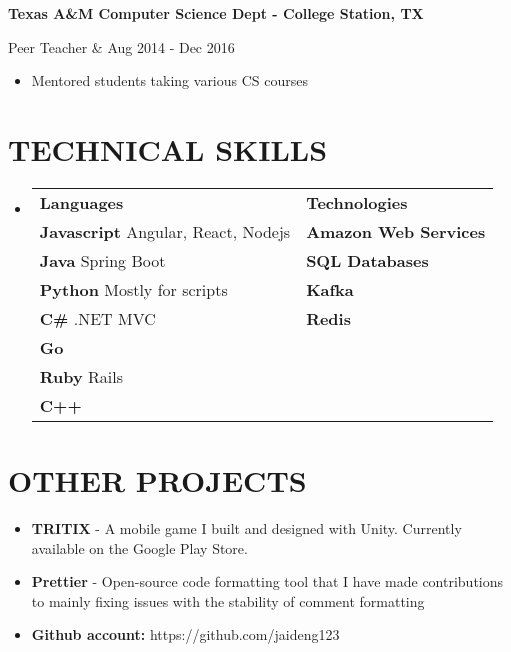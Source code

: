 \documentclass[margin,10pt]{res} %
\begin{document}
\begin{resume}
\begin{itemize}
                \end{itemize}
				{\bf Texas A\&M Computer Science Dept - College Station, TX} \\ 
                \begin{ncolumn}{2} %
                Peer Teacher &   Aug 2014 - Dec 2016 
                \end{ncolumn}
                \begin{itemize}           
                \item[] Mentored students taking various CS courses
                \end{itemize}
 

                    
\section{TECHNICAL SKILLS}	
							\begin{itemize}
                    		\item[] 
\begin{tabular}{ll}
\textbf{\large Languages}  & \textbf{\large Technologies}        \\
\textbf{Javascript} Angular, React, Nodejs  & \textbf{Amazon Web Services} \\
\textbf{Java} Spring Boot   & \textbf{SQL Databases}       \\
\textbf{Python} Mostly for scripts  & \textbf{Kafka}               \\
\textbf{C\#} .NET MVC     & \textbf{Redis}               \\
\textbf{Go}        &                     \\
\textbf{Ruby}  Rails     &                     \\
\textbf{C++}        &                    
\end{tabular}
                    		\end{itemize} 
\section{OTHER PROJECTS}
				\begin{itemize}           
                	\item \textbf{TRITIX} - A mobile game I built and designed with Unity. Currently available on the Google Play Store.
                	\item \textbf{Prettier} - Open-source code formatting tool that I have made contributions to mainly fixing issues with the stability of comment formatting
                	\item[] \textbf{Github account:} https://github.com/jaideng123
                \end{itemize}
\end{resume} 
\end{document}
